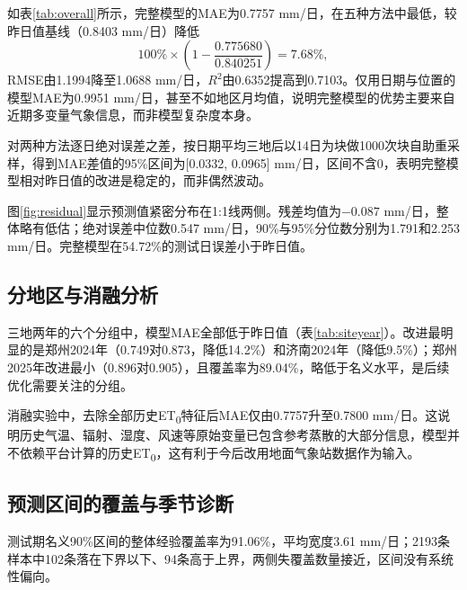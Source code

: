如表\ref{tab:overall}所示，完整模型的MAE为0.7757 mm/日，在五种方法中最低，较昨日值基线（0.8403 mm/日）降低
\begin{equation}
100\%\times\left(1-\frac{0.775680}{0.840251}\right)=7.68\%,
\end{equation}
RMSE由1.1994降至1.0688 mm/日，$R^2$由0.6352提高到0.7103。仅用日期与位置的模型MAE为0.9951 mm/日，甚至不如地区月均值，说明完整模型的优势主要来自近期多变量气象信息，而非模型复杂度本身。

对两种方法逐日绝对误差之差，按日期平均三地后以14日为块做1000次块自助重采样，得到MAE差值的95\%区间为[0.0332, 0.0965] mm/日，区间不含0，表明完整模型相对昨日值的改进是稳定的，而非偶然波动。


图\ref{fig:residual}显示预测值紧密分布在1:1线两侧。残差均值为$-0.087$ mm/日，整体略有低估；绝对误差中位数0.547 mm/日，90\%与95\%分位数分别为1.791和2.253 mm/日。完整模型在54.72\%的测试日误差小于昨日值。

\subsection{分地区与消融分析}

三地两年的六个分组中，模型MAE全部低于昨日值（表\ref{tab:siteyear}）。改进最明显的是郑州2024年（0.749对0.873，降低14.2\%）和济南2024年（降低9.5\%）；郑州2025年改进最小（0.896对0.905），且覆盖率为89.04\%，略低于名义水平，是后续优化需要关注的分组。

消融实验中，去除全部历史ET\textsubscript{0}特征后MAE仅由0.7757升至0.7800 mm/日。这说明历史气温、辐射、湿度、风速等原始变量已包含参考蒸散的大部分信息，模型并不依赖平台计算的历史ET\textsubscript{0}，这有利于今后改用地面气象站数据作为输入。

\subsection{预测区间的覆盖与季节诊断}
测试期名义90\%区间的整体经验覆盖率为91.06\%，平均宽度3.61 mm/日；2193条样本中102条落在下界以下、94条高于上界，两侧失覆盖数量接近，区间没有系统性偏向。



